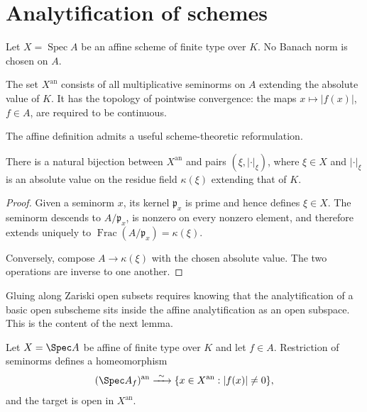 \section{Analytification of schemes}
\label{sec:berk-analytification}

Let $X=\operatorname{Spec}A$ be an affine scheme of finite type over $K$.
No Banach norm is chosen on $A$.

\begin{definition}
\label{def:berk-affine-analytification}
The set $X^{\mathrm{an}}$ consists of all multiplicative seminorms on $A$
extending the absolute value of $K$. It has the topology of pointwise
convergence: the maps $x\mapsto |f(x)|$, $f\in A$, are required to be
continuous.
\end{definition}

The affine definition admits a useful scheme-theoretic reformulation.

\begin{proposition}\label{prop:berk-pair-description}
There is a natural bijection between $X^{\mathrm{an}}$ and pairs
$(\xi,|\cdot|_\xi)$, where $\xi\in X$ and $|\cdot|_\xi$ is an absolute
value on the residue field $\kappa(\xi)$ extending that of $K$.
\end{proposition}

\begin{proof}
Given a seminorm $x$, its kernel $\mathfrak p_x$ is prime and hence
defines $\xi\in X$. The seminorm descends to $A/\mathfrak p_x$, is
nonzero on every nonzero element, and therefore extends uniquely to
$\operatorname{Frac}(A/\mathfrak p_x)=\kappa(\xi)$.

Conversely, compose $A\to\kappa(\xi)$ with the chosen absolute value.
The two operations are inverse to one another.
\end{proof}

Gluing along Zariski open subsets requires knowing that the
analytification of a basic open subscheme sits inside the affine
analytification as an open subspace.  This is the content of the next
lemma.

\begin{lemma}\label{lem:berk-localization}
Let $X=\Spec A$ be affine of finite type over $K$ and let $f\in A$.
Restriction of seminorms defines a homeomorphism
\[
 (\Spec A_f)^{\mathrm{an}}
 \xrightarrow{\ \sim\ }
 \{x\in X^{\mathrm{an}}:|f(x)|\neq0\},
\]
and the target is open in $X^{\mathrm{an}}$.
\end{lemma}


